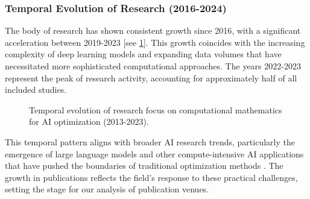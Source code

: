 \documentclass[a4paper,12pt]{acm/acmart}
\begin{document}
\subsubsection{Temporal Evolution of Research (2016-2024)}\label{subsubsec:overview-of-included-studies:temporal-evolution-of-research-2016-2024}
The body of research has shown consistent growth since 2016, with a significant acceleration between 2019-2023 [see \cref{fig:temporal_evolution}]. This growth coincides with the increasing complexity of deep learning models and expanding data volumes that have necessitated more sophisticated computational approaches. The years 2022-2023 represent the peak of research activity, accounting for approximately half of all included studies.

\begin{figure}[ht]
    \centering
    \caption{Temporal evolution of research focus on computational mathematics for AI optimization (2013-2023).}
    \label{fig:temporal_evolution}
\end{figure}

This temporal pattern aligns with broader AI research trends, particularly the emergence of large language models and other compute-intensive AI applications that have pushed the boundaries of traditional optimization methods \citep{ataei2024filtering}. The growth in publications reflects the field's response to these practical challenges, setting the stage for our analysis of publication venues.
\end{document}
